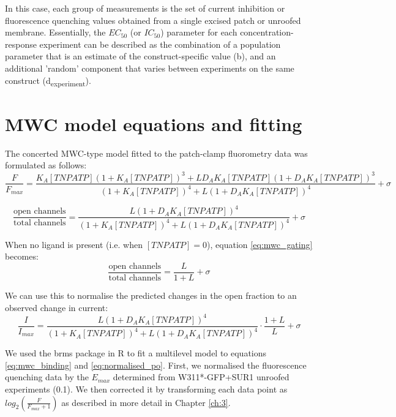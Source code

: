In this case, each group of measurements is the set of current inhibition or fluorescence quenching values obtained from a single excised patch or unroofed membrane.
Essentially, the $EC_{50}$ (or $IC_{50}$) parameter for each concentration-response experiment can be described as the combination of a population parameter that is an estimate of the construct-specific value (\textgreek{b}), and an additional 'random' component that varies between experiments on the same construct (\textgreek{d}\textsubscript{experiment}).

\section{MWC model equations and fitting}

The concerted MWC-type model fitted to the patch-clamp fluorometry data was formulated as follows:
\begin{equation} \label{eq:mwc_binding}
\frac{F}{F_{max}} = \frac
    {K_A[TNPATP](1+K_A[TNPATP])^3+LD_AK_A[TNPATP](1+D_AK_A[TNPATP])^3}
    {(1+K_A[TNPATP])^4+L(1+D_AK_A[TNPATP])^4} + \sigma
\end{equation}

\begin{equation} \label{eq:mwc_gating}
\frac{\text{open channels}}{\text{total channels}} = \frac
    {L(1+D_AK_A[TNPATP])^4}
    {(1+K_A[TNPATP])^4+L(1+D_AK_A[TNPATP])^4} + \sigma
\end{equation}

When no ligand is present (i.e. when $[TNPATP] = 0$), equation \ref{eq:mwc_gating} becomes:
\begin{equation} \label{eq:intrinsic_po}
\frac{\text{open channels}}{\text{total channels}} = \frac
    {L}
    {1+L} + \sigma
\end{equation}

We can use this to normalise the predicted changes in the open fraction to an observed change in current:
\begin{equation} \label{eq:normalised_po}
\frac{I}{I_{max}} = \frac
    {L(1+D_AK_A[TNPATP])^4}
    {(1+K_A[TNPATP])^4+L(1+D_AK_A[TNPATP])^4}\cdot
   \frac
    {1+L}
    {L} + \sigma
\end{equation}

We used the brms package in R to fit a multilevel model to equations \ref{eq:mwc_binding} and \ref{eq:normalised_po}.
First, we normalised the fluorescence quenching data by the $E_{max}$ determined from W311*-GFP+SUR1 unroofed experiments (0.1).
We then corrected it by transforming each data point as $log_2(\frac{F}{F_{max} + 1})$ as described in more detail in Chapter \ref{ch:3}.

